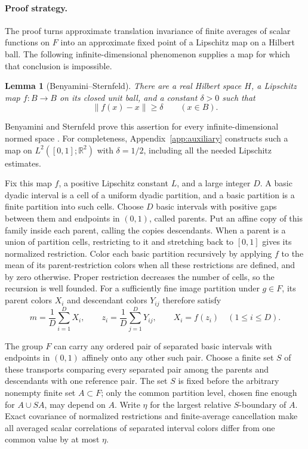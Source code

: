 \documentclass[11pt]{article}
\newcommand{\R}{\mathbb R}
\newcommand{\norm}[1]{\lVert #1\rVert}
\newtheorem{lemma}[theorem]{Lemma}
\theoremstyle{definition}
\numberwithin{equation}{section}
\begin{document}
\paragraph{Proof strategy.}
The proof turns approximate translation invariance of finite averages of
scalar functions on \(F\) into an approximate fixed point of a Lipschitz
map on a Hilbert ball. The
following infinite-dimensional phenomenon supplies a map for which that
conclusion is impossible.

\begin{lemma}[Benyamini--Sternfeld]\label{lem:displacement}
There are a real Hilbert space \(H\), a Lipschitz map \(f:B\to B\) on its
closed unit ball, and a constant \(\delta>0\) such that
\[
  \norm{f(x)-x}\ge\delta\qquad(x\in B).
\]
\end{lemma}

Benyamini and Sternfeld prove this assertion for every infinite-dimensional
normed space \cite[Theorem, part~(3), p.~439]{BenyaminiSternfeld1983}.
For completeness, Appendix~\ref{app:auxiliary} constructs such a map on
\(L^2([0,1];\R^2)\) with \(\delta=1/2\), including all the needed
Lipschitz estimates.

Fix this map \(f\), a positive Lipschitz constant \(L\), and a large
integer \(D\). A basic dyadic interval is a cell of a uniform dyadic
partition, and a basic partition is a finite partition into such cells.
Choose \(D\) basic intervals with positive gaps between them and endpoints
in \((0,1)\), called parents. Put an affine copy of this family inside
each parent, calling the copies descendants. When a parent is a union
of partition cells, restricting to it and stretching back to \([0,1]\)
gives its normalized restriction. Color each basic partition recursively
by applying \(f\) to the mean of its parent-restriction colors when all
these restrictions are defined, and by zero otherwise. Proper
restriction decreases the number of cells, so the recursion is well
founded. For a sufficiently fine image partition under \(g\in F\), its
parent colors \(X_i\) and descendant colors \(Y_{ij}\) therefore satisfy
\[
 m=\frac1D\sum_{i=1}^D X_i,\qquad
 z_i=\frac1D\sum_{j=1}^D Y_{ij},\qquad
 X_i=f(z_i)\quad(1\le i\le D).
\]

The group \(F\) can carry any ordered pair of separated basic intervals
with endpoints in \((0,1)\) affinely onto any other such pair. Choose a
finite set \(S\) of these transports comparing every separated pair among
the parents and descendants with one reference pair. The set \(S\) is
fixed before the arbitrary nonempty
finite set \(A\subset F\); only the common partition level, chosen fine
enough for \(A\cup SA\), may depend on \(A\). Write \(\eta\) for the
largest relative \(S\)-boundary of \(A\). Exact covariance of normalized
restrictions and finite-average cancellation make all averaged scalar
correlations of separated interval colors differ from one common value
by at most \(\eta\).
\end{document}
